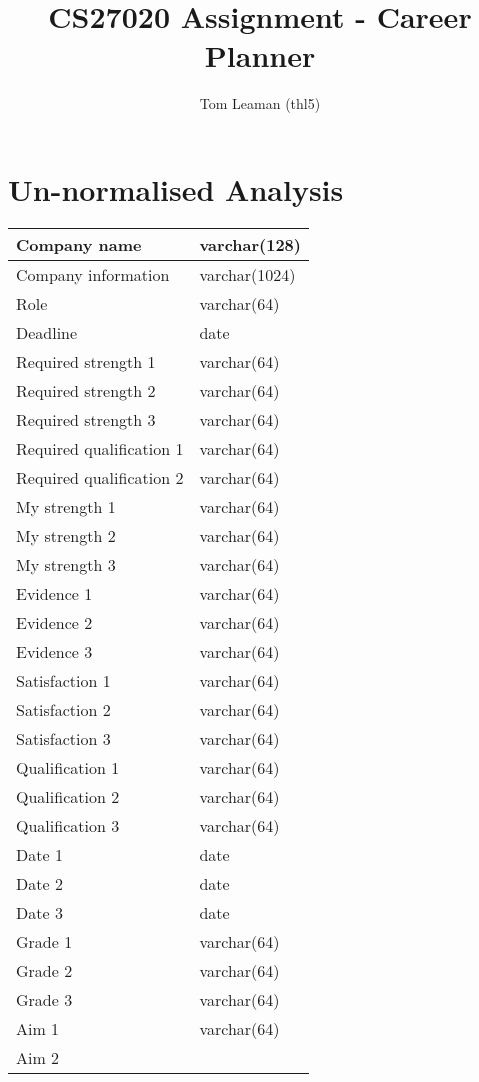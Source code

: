 \documentclass[a4paper, twoside]{article}
\title{CS27020 Assignment - Career Planner} \author{Tom Leaman (thl5)}
\begin{document}
 \maketitle \newpage

\section{Un-normalised Analysis}

\begin{center} \begin{tabular}{|l|l|} \hline Company name & varchar(128) \\
\hline Company information & varchar(1024) \\ \hline Role & varchar(64) \\
\hline Deadline & date \\ \hline Required strength 1 & varchar(64) \\ \hline
Required strength 2 & varchar(64) \\ \hline Required strength 3 & varchar(64) \\
\hline Required qualification 1 & varchar(64) \\ \hline Required qualification 2
& varchar(64) \\ \hline My strength 1 & varchar(64) \\ \hline My strength 2 &
varchar(64) \\ \hline My strength 3 & varchar(64) \\ \hline Evidence 1 &
varchar(64) \\ \hline Evidence 2 & varchar(64) \\ \hline Evidence 3 &
varchar(64) \\ \hline Satisfaction 1 & varchar(64) \\ \hline Satisfaction 2 &
varchar(64) \\ \hline Satisfaction 3 & varchar(64) \\ \hline Qualification 1 &
varchar(64) \\ \hline Qualification 2 & varchar(64) \\ \hline Qualification 3 &
varchar(64) \\ \hline Date 1 & date \\ \hline Date 2 & date \\ \hline Date 3 &
date \\ \hline Grade 1 & varchar(64) \\ \hline Grade 2 & varchar(64) \\ \hline
Grade 3 & varchar(64) \\ \hline Aim 1 & varchar(64) \\ \hline Aim 2 &

\end{tabular}
\end{center}
\end{document}
